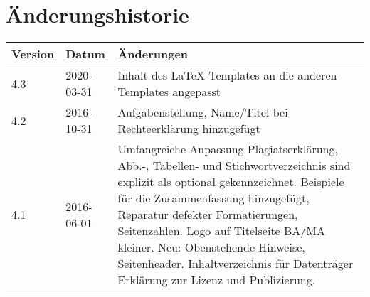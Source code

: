 \section*{Änderungshistorie}


\begin{tabularx}{\textwidth}{@{}llX@{}}
\toprule
    \textbf{Version} & \textbf{Datum} & \textbf{Änderungen} \\
\midrule
4.3 & 2020-03-31 & Inhalt des \LaTeX-Templates an die anderen Templates angepasst \\
\midrule
4.2 & 2016-10-31 & Aufgabenstellung, Name/Titel bei Rechteerklärung hinzugefügt \\
\midrule
4.1 & 2016-06-01 & Umfangreiche Anpassung Plagiatserklärung, Abb.-, Tabellen- und Stichwortverzeichnis sind explizit als optional gekennzeichnet. Beispiele für die Zusammenfassung hinzugefügt, Reparatur defekter Formatierungen, Seitenzahlen. Logo auf Titelseite BA/MA kleiner.
Neu: Obenstehende Hinweise, Seitenheader. Inhaltverzeichnis für Datenträger Erklärung zur Lizenz und Publizierung. \\
\bottomrule
\end{tabularx}

\newpage
